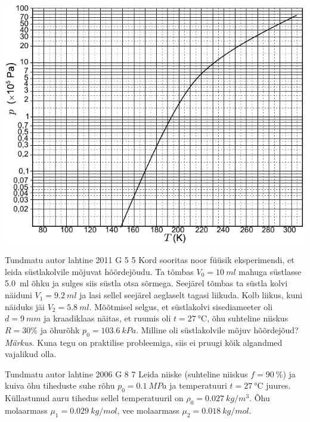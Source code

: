 \documentclass[11pt, twoside]{article}
\begin{document}
{{\begin{center}
	\includegraphics{2010-v3g-06-Aururohk}
\end{center}
\fi
}

{Tundmatu autor} %
{lahtine} %
{2011} %
{G 5} %
{5} %
{
\ifStatement
Kord sooritas noor füüsik eksperimendi, et leida süstlakolvile mõjuvat
hõõrdejõudu. Ta tõmbas $V_{0}=\SI{10}{ml}$ mahuga süstlasse \SI{5,0}{ml} õhku ja sulges siis
süstla otsa sõrmega. Seejärel tõmbas ta süstla kolvi näiduni
$V_{1}=\SI{9,2}{ml}$ ja
lasi sellel seejärel aeglaselt tagasi liikuda. Kolb liikus, kuni näiduks jäi $V_{2}=\SI{5,8}{ml}$.
Mõõtmisel selgus, et süstlakolvi sisediameeter oli $d=\SI{9}{mm}$ ja kraadiklaas
näitas, et ruumis oli $t=\SI{27}{\celsius}$, õhu suhteline niiskus $R=30\%$ ja õhurõhk
$p_{0}=\SI{103,6}{kPa}$. Milline oli süstlakolvile mõjuv hõõrdejõud?\\
\textit{Märkus.} Kuna tegu on praktilise probleemiga, siis ei pruugi kõik
algandmed vajalikud olla.
\fi
}

{Tundmatu autor} %
{lahtine} %
{2006} %
{G 8} %
{7} %
{
\ifStatement
Leida niiske (suhteline niiskus $f = \SI{90}{\%}$) ja kuiva õhu tiheduste suhe rõhu $p_0 = \SI{0,1}{MPa}$ ja temperatuuri $t = \SI{27}{\celsius}$ juures. Küllastunud auru tihedus sellel temperatuuril on $\rho_0 = \SI{0,027}{kg/m^3}$. Õhu molaarmass $\mu_1 = \SI{0,029}{kg/mol}$, vee molaarmass $\mu_2 = \SI{0,018}{kg/mol}$.
\fi
}

}
\end{document}
